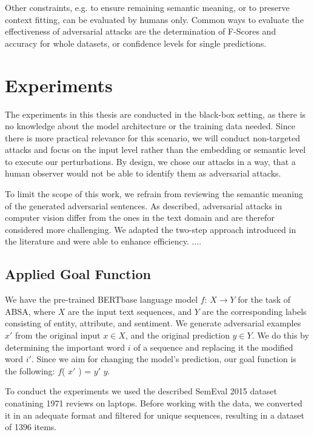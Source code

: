 Other constraints, e.g. to ensure remaining semantic meaning, or to preserve context fitting, can be evaluated by humans only. 
Common ways to evaluate the effectiveness of adversarial attacks are the determination of F-Scores and accuracy for whole datasets, or confidence levels for single predictions. 

\section{Experiments}
\label{sec:experiments}

The experiments in this thesis are conducted in the black-box setting, as there is no knowledge about the model architecture or the training data needed. Since there is more practical relevance for this scenario, we will conduct non-targeted attacks and focus on the input level rather than the embedding or semantic level to execute our perturbations. 
By design, we chose our attacks in a way, that a human observer would not be able to identify them as adversarial attacks. 

To limit the scope of this work, we refrain from reviewing the semantic meaning of the generated adversarial sentences.
As described, adversarial attacks in computer vision differ from the ones in the text domain and are therefor considered more challenging. We adapted the two-step approach introduced in the literature and were able to enhance efficiency. 
....

\subsection{Applied Goal Function}
 \label{sec:goal_function_m}
We have the pre-trained BERTbase language model $f$: ${X \rightarrow Y}$ for the task of ABSA, where $X$ are the input text sequences, and $Y$ are the corresponding labels consisting of entity, attribute, and sentiment. We generate adversarial examples ${x'}$ from the original input $x \in X$, and the original prediction $y \in Y$. We do this by determining the important word $i$ of a sequence and replacing it the modified word $i'$. Since we aim for changing the model's prediction, our goal function is the following: 
$f$( $x'$ ) = $y'$ \neq $y$.


To conduct the experiments we used the described SemEval 2015 dataset conatining 1971 reviews on laptops. Before working with the data, we converted it in an adequate format and filtered for unique sequences, resulting in a dataset of 1396 items. 


